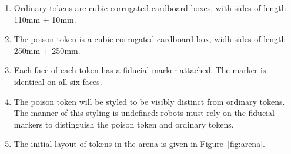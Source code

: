\begin{enumerate}
  \item Ordinary tokens are cubic corrugated cardboard boxes, with sides of
        length \si{110}{mm} $\pm$ \si{10}{mm}.
  \item The poison token is a cubic corrugated cardboard box, widh sides of
        length \si{250}{mm} $\pm$ \si{250}{mm}.
  \item Each face of each token has a fiducial marker attached. The marker is
        identical on all six faces.
  \item The poison token will be styled to be visibly distinct from ordinary
        tokens. The manner of this styling is undefined: robots must rely on
        the fiducial markers to distinguish the poison token and ordinary
        tokens.
  \item The initial layout of tokens in the arena is given in
        Figure~\ref{fig:arena}.
\end{enumerate}

